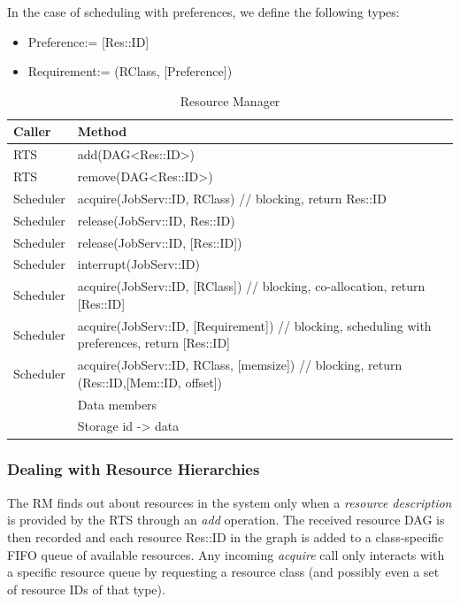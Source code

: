 \documentclass[10pt]{article}
\newcommand{\rts}{RTS\xspace}
\newcommand{\sched}{Scheduler\xspace}
\newcommand{\rman}{RM\xspace}
\newcommand{\rdag}{DAG\xspace}
\newcommand{\js}{JobServ\xspace}
\newcommand{\res}{Res\xspace}
\newcommand{\rc}{RClass\xspace}
\newcommand{\pref}{Preference\xspace}
\newcommand{\req}{Requirement\xspace}
\newcommand{\id}{::ID\xspace}
\begin{document}
In the case of scheduling with preferences, we define the following types:
\begin{itemize}
    \item \pref := [\res\id]
    \item \req := (\rc, [\pref])
\end{itemize}

%
\begin{table}[ht]
    \centering
    \caption{Resource Manager}
    \label{tab:rm}
    \bgroup
    \setlength{\tabcolsep}{2em}
    \begin{tabular}{ll}
        \toprule
        Caller & Method \\
        \midrule
        \rts & add(\rdag<\res\id>) \\
        \rts & remove(\rdag<\res\id>) \\
        \sched & acquire(\js\id, \rc) // blocking, return \res\id  \\
        \sched & release(\js\id, \res\id) \\ 
        \sched & release(\js\id, [\res\id]) \\
        \sched & interrupt(\js\id) \\
        \midrule
        \sched & acquire(\js\id, [\rc]) // blocking, co-allocation, 
        return [\res\id]  \\
        \sched & acquire(\js\id, [\req]) // blocking, 
        scheduling with preferences, return [\res\id]  \\
        \sched & acquire(\js\id, \rc, [memsize]) // blocking, 
        return (\res\id,[Mem\id, offset])  \\
        \midrule
        & Data members \\
        \midrule
        & Storage id -> data \\
        \bottomrule
    \end{tabular}
    \egroup
\end{table}
%


\subsubsection{Dealing with Resource Hierarchies}
The \rman finds out about resources in the system only when a \emph{resource 
    description} is provided by the \rts through an \emph{add} operation. The
received resource \rdag is then recorded and each resource \res\id in the graph
is added to a class-specific FIFO queue of available resources.
Any incoming \emph{acquire} call only interacts with a specific resource queue
by requesting a resource class (and possibly even a set of resource IDs of that
type).
\end{document}
